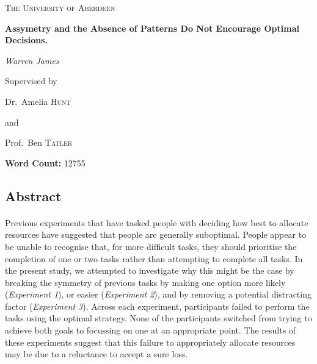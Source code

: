 \documentclass[12pt]{article}
\begin{document}
\begin{titlepage}
	\centering
	{\scshape\Large The University of Aberdeen \par}
	\vspace{1cm}
	{\huge\bfseries Assymetry and the Absence of Patterns Do Not Encourage Optimal Decisions.\par}
	\vspace{1cm}
	{\Large\itshape Warren James\par}
	\vfill
	Supervised by\par
	Dr.~Amelia \textsc{Hunt}\par
	and\par
	Prof.~Ben \textsc{Tatler}\par
	\textbf{Word Count:} 12755
	\vfill
\end{titlepage}	


\newpage
\begin{center}
\section*{Abstract}
\paragraph{} Previous experiments that have tasked people with deciding how best to allocate resources have suggested that people are generally suboptimal. People appear to be unable to recognise that, for more difficult tasks, they should prioritise the completion of one or two tasks rather than attempting to complete all tasks. In the present study, we attempted to investigate why this might be the case by breaking the symmetry of previous tasks by making one option more likely (\textit{Experiment 1}), or easier (\textit{Experiment 2}), and by removing a potential distracting factor (\textit{Experiment 3}). Across each experiment, participants failed to perform the tasks using the optimal strategy. None of the participants switched from trying to achieve both goals to focussing on one at an appropriate point. The results of these experiments suggest that this failure to appropriately allocate resources may be due to a reluctance to accept a sure loss. 
\end{center}
\end{document}

